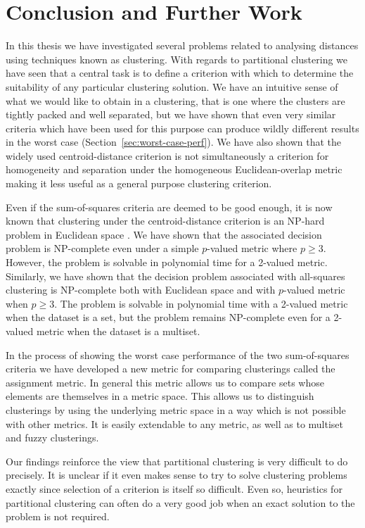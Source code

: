 \chapter{Conclusion and Further Work}
\label{cha:conclusion}

In this thesis we have investigated several problems related to analysing
distances using techniques known as clustering.  With regards to partitional
clustering we have seen that a central task is to define a criterion with
which to determine the suitability of any particular clustering solution.  We
have an intuitive sense of what we would like to obtain in a clustering, that
is one where the clusters are tightly packed and well separated, but we have
shown that even very similar criteria which have been used for this purpose
can produce wildly different results in the worst case
(Section~\ref{sec:worst-case-perf}).  We have also shown that the widely used
centroid-distance criterion is not simultaneously a criterion for homogeneity
and separation under the homogeneous Euclidean-overlap metric making it less
useful as a general purpose clustering criterion.

Even if the sum-of-squares criteria are deemed to be good enough, it is now
known that clustering under the centroid-distance criterion is an NP-hard
problem in Euclidean space \cite{aloise09,mahajan09}.  We have shown that the
associated decision problem is NP-complete even under a simple $p$-valued
metric where $p \geq 3$.  However, the problem is solvable in polynomial time
for a 2-valued metric.  Similarly, we have shown that the decision problem
associated with all-squares clustering is NP-complete both with Euclidean
space and with $p$-valued metric when $p \geq 3$.  The problem is solvable in
polynomial time with a 2-valued metric when the dataset is a set, but the
problem remains NP-complete even for a 2-valued metric when the dataset is a
multiset.

In the process of showing the worst case performance of the two sum-of-squares
criteria we have developed a new metric for comparing clusterings called the
assignment metric.  In general this metric allows us to compare sets whose
elements are themselves in a metric space.  This allows us to distinguish
clusterings by using the underlying metric space in a way which is not
possible with other metrics.  It is easily extendable to any metric, as well
as to multiset and fuzzy clusterings.

Our findings reinforce the view that partitional clustering is very difficult
to do precisely.  It is unclear if it even makes sense to try to solve
clustering problems exactly since selection of a criterion is itself so
difficult.  Even so, heuristics for partitional clustering can often do a very
good job when an exact solution to the problem is not required.

